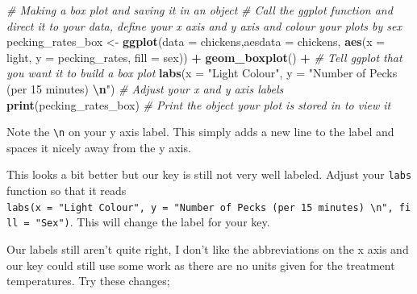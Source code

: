 \documentclass[
]{book}
\newenvironment{Shaded}{\begin{snugshade}}{\end{snugshade}}
\newcommand{\AttributeTok}[1]{\textcolor[rgb]{0.13,0.29,0.53}{#1}}
\newcommand{\CommentTok}[1]{\textcolor[rgb]{0.56,0.35,0.01}{\textit{#1}}}
\newcommand{\FunctionTok}[1]{\textcolor[rgb]{0.13,0.29,0.53}{\textbf{#1}}}
\newcommand{\NormalTok}[1]{#1}
\newcommand{\OtherTok}[1]{\textcolor[rgb]{0.56,0.35,0.01}{#1}}
\newcommand{\SpecialCharTok}[1]{\textcolor[rgb]{0.81,0.36,0.00}{\textbf{#1}}}
\newcommand{\StringTok}[1]{\textcolor[rgb]{0.31,0.60,0.02}{#1}}
\begin{document}
\begin{Shaded}
\begin{Highlighting}[]
\CommentTok{\# Making a box plot and saving it in an object}
\CommentTok{\# Call the ggplot function and direct it to your data, define your x axis and y axis and colour your plots by sex}
\NormalTok{pecking\_rates\_box }\OtherTok{\textless{}{-}} \FunctionTok{ggplot}\NormalTok{(}\AttributeTok{data =}\NormalTok{ chickens,}\AttributeTok{aesdata =}\NormalTok{ chickens, }\FunctionTok{aes}\NormalTok{(}\AttributeTok{x =}\NormalTok{ light, }\AttributeTok{y =}\NormalTok{ pecking\_rates, }\AttributeTok{fill =}\NormalTok{ sex)) }\SpecialCharTok{+}
  \FunctionTok{geom\_boxplot}\NormalTok{() }\SpecialCharTok{+} \CommentTok{\# Tell ggplot that you want it to build a box plot}
  \FunctionTok{labs}\NormalTok{(}\AttributeTok{x =} \StringTok{"Light Colour"}\NormalTok{, }\AttributeTok{y =} \StringTok{"Number of Pecks (per 15 minutes) }\SpecialCharTok{\textbackslash{}n}\StringTok{"}\NormalTok{) }\CommentTok{\# Adjust your x and y axis labels}
\FunctionTok{print}\NormalTok{(pecking\_rates\_box) }\CommentTok{\# Print the object your plot is stored in to view it}
\end{Highlighting}
\end{Shaded}

Note the \texttt{\textbackslash{}n} on your y axis label. This simply adds a new line to the label and spaces it nicely away from the y axis.

This looks a bit better but our key is still not very well labeled. Adjust your \texttt{labs} function so that it reads \texttt{labs(x\ =\ "Light\ Colour",\ y\ =\ "Number\ of\ Pecks\ (per\ 15\ minutes)\ \textbackslash{}n",\ fill\ =\ "Sex")}. This will change the label for your key.

Our labels still aren't quite right, I don't like the abbreviations on the x axis and our key could still use some work as there are no units given for the treatment temperatures. Try these changes;
\end{document}
